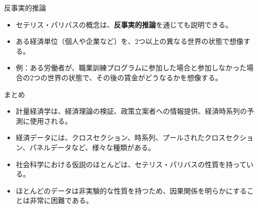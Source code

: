 \documentclass[
  ignorenonframetext,
]{beamer}
\providecommand{\tightlist}{%
  \setlength{\itemsep}{0pt}\setlength{\parskip}{0pt}}
\begin{document}
\begin{frame}{反事実的推論}
\label{ux53cdux4e8bux5b9fux7684ux63a8ux8ad6}
\begin{itemize}
\tightlist
\item
  セテリス・パリバスの概念は、\textbf{反事実的推論}を通じても説明できる。
\item
  ある経済単位（個人や企業など）を、2つ以上の異なる世界の状態で想像する。
\item
  例：ある労働者が、職業訓練プログラムに参加した場合と参加しなかった場合の2つの世界の状態で、その後の賃金がどうなるかを想像する。
\end{itemize}
\end{frame}

\begin{frame}{まとめ}
\label{ux307eux3068ux3081}
\begin{itemize}
\tightlist
\item
  計量経済学は、経済理論の検証、政策立案者への情報提供、経済時系列の予測に使用される。
\item
  経済データには、クロスセクション、時系列、プールされたクロスセクション、パネルデータなど、様々な種類がある。
\item
  社会科学における仮説のほとんどは、セテリス・パリバスの性質を持っている。
\item
  ほとんどのデータは非実験的な性質を持つため、因果関係を明らかにすることは非常に困難である。
\end{itemize}
\end{frame}
\end{document}
